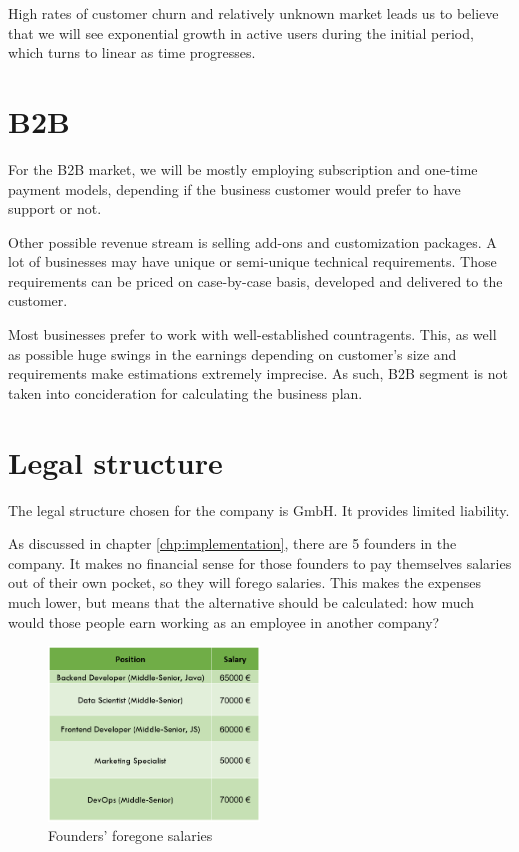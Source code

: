 High rates of customer churn and relatively unknown market leads us to believe that we will see exponential growth in active users during the initial period, which turns to linear as time progresses.

\section{B2B}
For the B2B market, we will be mostly employing subscription and one-time payment models, depending if the business customer would prefer to have support or not.

Other possible revenue stream is selling add-ons and customization packages. A lot of businesses may have unique or semi-unique technical requirements. Those requirements can be priced on case-by-case basis, developed and delivered to the customer.

Most businesses prefer to work with well-established countragents. This, as well as possible huge swings in the earnings depending on customer's size and requirements make estimations extremely imprecise. As such, B2B segment is not taken into concideration for calculating the business plan.

\section{Legal structure}

The legal structure chosen for the company is GmbH. It provides limited liability.

As discussed in chapter \ref{chp:implementation}, there are 5 founders in the company. It makes no financial sense for those founders to pay themselves salaries out of their own pocket, so they will forego salaries. This makes the expenses much lower, but means that the alternative should be calculated: how much would those people earn working as an employee in another company?

\begin{figure}[H]
    \centering
    \includegraphics[width=0.5\textwidth]{figures/founder_salaries.png}
    \caption{Founders' foregone salaries}
    \label{fig:founder_salaries}
\end{figure}

